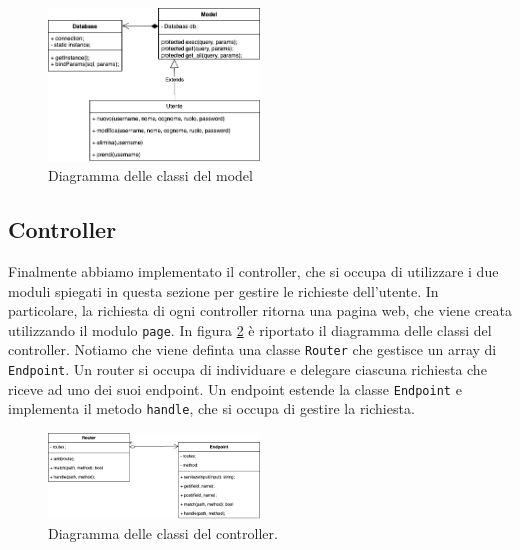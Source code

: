 \begin{figure}[h]
	\centering
	\includegraphics[width=0.5\textwidth]{figures/model}
	\caption{Diagramma delle classi del model}
	\label{fig:model}
\end{figure}

\subsection{Controller}

Finalmente abbiamo implementato il controller, che si occupa di utilizzare i due
moduli spiegati in questa sezione per gestire le richieste dell'utente. In
particolare, la richiesta di ogni controller ritorna una pagina web, che viene
creata utilizzando il modulo \texttt{page}. In figura \ref{fig:controller} è
riportato il diagramma delle classi del controller. Notiamo che viene definta
una classe \texttt{Router} che gestisce un array di \texttt{Endpoint}. Un router
si occupa di individuare e delegare ciascuna richiesta che riceve ad uno dei
suoi endpoint. Un endpoint estende la classe \texttt{Endpoint} e implementa il
metodo \texttt{handle}, che si occupa di gestire la richiesta.
\begin{figure}[h]
	\centering
	\includegraphics[width=0.5\textwidth]{figures/controller}
	\caption{Diagramma delle classi del controller.}
	\label{fig:controller}
\end{figure}
